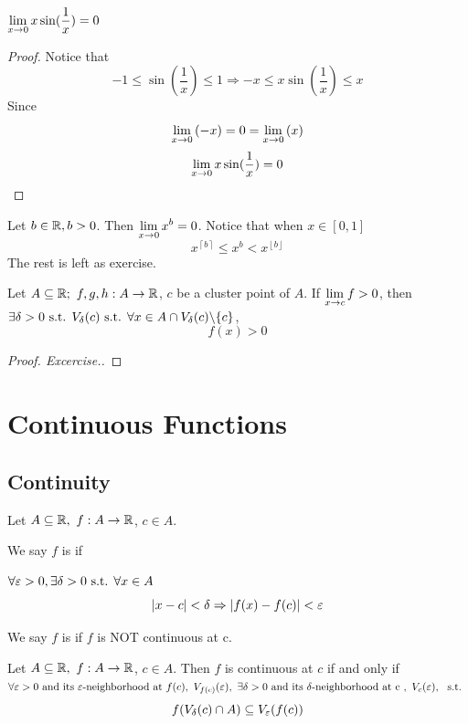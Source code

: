 \documentclass[a4paper,12pt]{article}
\begin{document}
\begin{example}
    \(\displaystyle\lim_{x\rightarrow 0 } {x\sin(\frac{1 }{x})}=0\)
    \begin{proof}
        Notice that
        \[-1\le \sin(\frac{1}{x })\le 1\Rightarrow-x\le x\sin(\frac{1}{x })\le x\]
        Since 
        \[\lim_{x\rightarrow 0} {(-x)}=0=\lim_{x\rightarrow 0} {(x)}\]
        \[\lim_{x\rightarrow 0} {x\sin(\frac{1}{x })}=0\]
    \end{proof}
\end{example}

\newpage
\begin{example}
    Let \(\displaystyle b\in\mathbb{R}, b>0\). Then \(\displaystyle\lim_{x\rightarrow 0} {x^b}=0\).
    Notice that when \(x\in[0,1]\)
    \[x^{\left\lceil b \right\rceil}\le x^b<x^{\left\lfloor b \right\rfloor}\]
    The rest is left as exercise.
\end{example}

\begin{theorem}
    Let \(A\subseteq\R;\ f,g,h:A\rightarrow\R\), \(c \) be a cluster point of \(A\). 
    If \(\displaystyle\lim_{x\rightarrow c } {f }>0\), then \(\displaystyle \exists \delta>0\text{ s.t. }V_{\delta}{(c)}\text{ s.t. } \forall x\in A\cap V_{\delta}{(c )}\backslash\{c\}\),
    \[f(x)>0\]
    \begin{proof}[Proof. Excercise.]
        
    \end{proof}
\end{theorem}

\newpage
\section{Continuous Functions}
\subsection{Continuity}
\begin{definition}
    Let \(A\subseteq\R,\ f:A\rightarrow\R\), \(c \in A\). 

    We say \(f \) is  if 

    \(\forall \varepsilon>0, \exists \delta>0 \text{ s.t. } \forall x\in A\)
    \[\left\lvert x-c\right\rvert<\delta\Rightarrow\left\lvert f(x)-f(c)\right\rvert<\varepsilon\]

    We say \(f\) is  if \(f\) is NOT continuous at c.\\
\end{definition}

\begin{definition}
    Let \(A\subseteq\R,\ f:A\rightarrow\R\), \(c \in A\). Then \(f\) is continuous at \(c\) if and only if\\
    \(\forall \varepsilon>0 \text{ and its } \varepsilon \text{-neighborhood at }f(c),\ \neighbor{f(c)}{\varepsilon},\ \exists \delta>0 \text{ and its }\delta \text{-neighborhood at c },\ \neighbor{c}{\varepsilon},\ \st\)
    \[f(V_{\delta}{(c)}\cap A)\subseteq V_{\varepsilon }{(f(c ))}\]
\end{definition}
\end{document}
